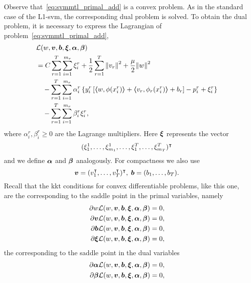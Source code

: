 Observe that~\eqref{eq:svmmtl_primal_add} is a convex problem. As in the standard case of the L1-\acrshort{svm}, the corresponding dual problem is solved. To obtain the dual problem, it is necessary to express the Lagrangian of problem~\eqref{eq:svmmtl_primal_add},
\begin{equation}\label{eq:svmmtl_lagrangian_add}
    \begin{aligned}
        & \lagr({w}, \fv{v}, \fv{b}, \fv{\xi}, \fv{\alpha}, \fv{\beta}) \\
        &= C \sum_{r= 1}^T \sum_{i=1}^{m_r} {\xi_{i}^r} + \frac{1}{2} \sum_{r= 1}^T{\norm{{v}_r}^2} + \frac{\mu}{2} {\norm{{w}}}^2 \\
        &\quad -  \sum_{r= 1}^T \sum_{i=1}^{m_r} \alpha_i^r \left\lbrace y_{i}^r \left[ \dotp{w}{\phi(x_{i}^r)} + \dotp{{v}_r}{\phi_r(x_{i}^r)} + b_r \right] - p_{i}^r + \xi_{i}^r  \right\rbrace \\
        &\quad -  \sum_{r= 1}^T \sum_{i=1}^{m_r} \beta_i^r \xi_i^r ,
    \end{aligned}
\end{equation}
where $\alpha_i^r, \beta_i^r \geq 0$ are the Lagrange multipliers. Here $\bm{\xi}$ represents the vector $$(\xi_1^1, \ldots, \xi_{m_1}^1, \ldots, \xi_1^T, \ldots, \xi_{m_T}^T)^\intercal$$ and we define $\bm{\alpha}$ and $\bm{\beta}$ analogously. For compactness we also use
$$ \bm{v} = (v_1^\intercal, \ldots, v_T^\intercal)^\intercal,\; \bm{b} = (b_1, \ldots, b_T).$$
Recall that the \acrshort{kkt} conditions for convex differentiable problems, like this one, are the corresponding to the saddle point in the primal variables, namely
\begin{align}
    \partial w \mathcal{L}({w}, \bm{v}, \bm{b}, \bm{\xi}, \bm{\alpha}, \bm{\beta}) = 0, \nonumber \\
    \partial \bm{v} \mathcal{L}({w}, \bm{v}, \bm{b}, \bm{\xi}, \bm{\alpha}, \bm{\beta}) = 0, \nonumber \\
    \partial \bm{b} \mathcal{L}({w}, \bm{v}, \bm{b}, \bm{\xi}, \bm{\alpha}, \bm{\beta}) = 0, \nonumber \\
    \partial \bm{\xi} \mathcal{L}({w}, \bm{v}, \bm{b}, \bm{\xi}, \bm{\alpha}, \bm{\beta}) = 0 , \nonumber
\end{align}
the corresponding to the saddle point in the dual variables
\begin{align}
    \partial \bm{\alpha} \mathcal{L}({w}, \bm{v}, \bm{b}, \bm{\xi}, \bm{\alpha}, \bm{\beta}) = 0, \nonumber \\
    \partial \bm{\beta} \mathcal{L}({w}, \bm{v}, \bm{b}, \bm{\xi}, \bm{\alpha}, \bm{\beta}) = 0 , \nonumber
\end{align}

